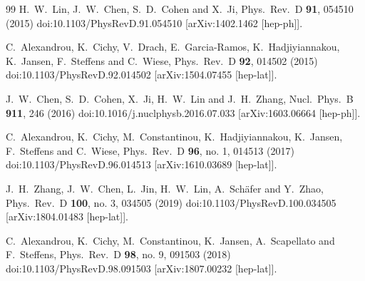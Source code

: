 \begin{thebibliography}{99}
  H.~W.~Lin, J.~W.~Chen, S.~D.~Cohen and X.~Ji,
  Phys.\ Rev.\ D {\bf 91}, 054510 (2015)
  doi:10.1103/PhysRevD.91.054510
  [arXiv:1402.1462 [hep-ph]].


  C.~Alexandrou, K.~Cichy, V.~Drach, E.~Garcia-Ramos, K.~Hadjiyiannakou, K.~Jansen, F.~Steffens and C.~Wiese,
  Phys.\ Rev.\ D {\bf 92}, 014502 (2015)
  doi:10.1103/PhysRevD.92.014502
  [arXiv:1504.07455 [hep-lat]].


  J.~W.~Chen, S.~D.~Cohen, X.~Ji, H.~W.~Lin and J.~H.~Zhang,
  Nucl.\ Phys.\ B {\bf 911}, 246 (2016)
  doi:10.1016/j.nuclphysb.2016.07.033
  [arXiv:1603.06664 [hep-ph]].


  C.~Alexandrou, K.~Cichy, M.~Constantinou, K.~Hadjiyiannakou, K.~Jansen, F.~Steffens and C.~Wiese,
  Phys.\ Rev.\ D {\bf 96}, no. 1, 014513 (2017)
  doi:10.1103/PhysRevD.96.014513
  [arXiv:1610.03689 [hep-lat]].


  J.~H.~Zhang, J.~W.~Chen, L.~Jin, H.~W.~Lin, A.~Sch\"afer and Y.~Zhao,
  Phys.\ Rev.\ D {\bf 100}, no. 3, 034505 (2019)
  doi:10.1103/PhysRevD.100.034505
  [arXiv:1804.01483 [hep-lat]].


  C.~Alexandrou, K.~Cichy, M.~Constantinou, K.~Jansen, A.~Scapellato and F.~Steffens,
  Phys.\ Rev.\ D {\bf 98}, no. 9, 091503 (2018)
  doi:10.1103/PhysRevD.98.091503
  [arXiv:1807.00232 [hep-lat]].



\end{thebibliography}
